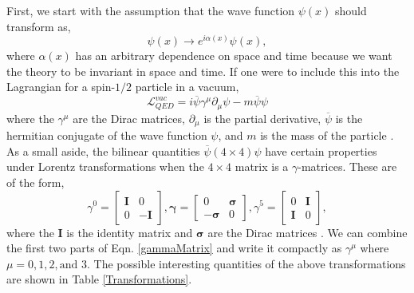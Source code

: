  First, we start with the assumption that the wave function $\psi(x)$ should transform as,
 \begin{equation}\label{U1gauge}
 \psi(x)\rightarrow e^{i\alpha(x)}\psi(x),
 \end{equation}
 where $\alpha(x)$ has an arbitrary dependence on space and time because we want the theory to be invariant in space and time. 
 If one were to include this into the Lagrangian for a spin-$1/2$ particle in a vacuum,
 \begin{equation}\label{DiracLag}
\mathcal{L}_{QED}^{vac}=i\overline{\psi}\gamma^\mu\partial_\mu\psi-m\overline{\psi}\psi
\end{equation}
 where the $\gamma^\mu$ are the Dirac matrices, $\partial_\mu$ is the partial derivative, $\overline{\psi}$ is the hermitian conjugate of the wave function $\psi$, and $m$ is the mass of the particle \cite{halzen_quarks_1984, peskin_introduction_1995}. As a small aside, the bilinear quantities $\overline{\psi}(4\times4)\psi$ have certain properties under Lorentz transformations when the $4\times4$ matrix is a $\gamma$-matrices. These are of the form,
\begin{equation} \label{gammaMatrix}
\gamma^0=
\begin{bmatrix}
\boldsymbol{I} & 0 \\
0 & -\boldsymbol{I}
\end{bmatrix},
\boldsymbol{\gamma}=
\begin{bmatrix}
0 & \boldsymbol{\sigma} \\
-\boldsymbol{\sigma} & 0
\end{bmatrix},
\gamma^5=
\begin{bmatrix}
0 & \boldsymbol{I} \\
\boldsymbol{I} & 0
\end{bmatrix},
\end{equation}
where the $\boldsymbol{I}$ is the identity matrix and $\boldsymbol{\sigma}$ are the Dirac matrices \cite{halzen_quarks_1984, peskin_introduction_1995}. We can combine the first two parts of Eqn. \ref{gammaMatrix} and write it compactly as $\gamma^\mu$ where $\mu=0,1,2, \text{and }3$. The possible interesting quantities of the above transformations are shown in Table \ref{Transformations}.

